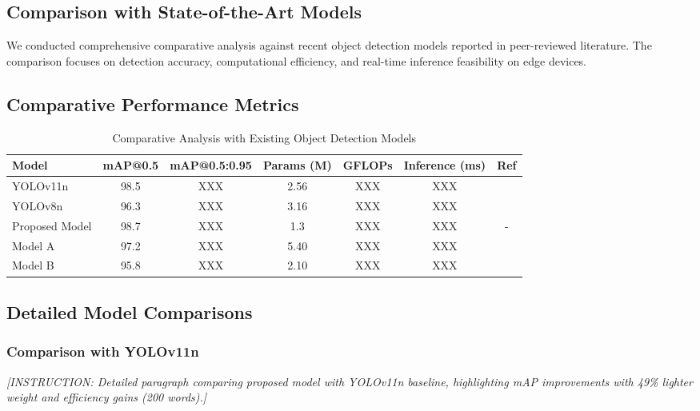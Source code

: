 \documentclass[11pt,a4paper]{article}
\begin{document}
\subsection{Comparison with State-of-the-Art Models}

We conducted comprehensive comparative analysis against recent object detection models reported in 
peer-reviewed literature. The comparison focuses on detection accuracy, computational efficiency, 
and real-time inference feasibility on edge devices.

\subsection{Comparative Performance Metrics}

\begin{table}[H]
    \centering
    \caption{Comparative Analysis with Existing Object Detection Models}
    \label{tab:comparative_models}
    \begin{tabular}{|l|c|c|c|c|c|c|}
    \hline
    \textbf{Model} & \textbf{mAP@0.5} & \textbf{mAP@0.5:0.95} & \textbf{Params (M)} & 
    \textbf{GFLOPs} & \textbf{Inference (ms)} & \textbf{Ref} \\
    \hline
    YOLOv11n & 98.5 & XXX & 2.56 & XXX & XXX & \cite{ref9} \\
    YOLOv8n & 96.3 & XXX & 3.16 & XXX & XXX & \cite{ref10} \\
    Proposed Model & 98.7 & XXX & 1.3 & XXX & XXX & - \\
    Model A & 97.2 & XXX & 5.40 & XXX & XXX & \cite{ref11} \\
    Model B & 95.8 & XXX & 2.10 & XXX & XXX & \cite{ref12} \\
    \hline
    \end{tabular}
\end{table}

\subsection{Detailed Model Comparisons}

\subsubsection{Comparison with YOLOv11n}

\textit{[INSTRUCTION: Detailed paragraph comparing proposed model with YOLOv11n baseline, highlighting 
mAP improvements with 49\% lighter weight and efficiency gains (200 words).]}
\end{document}
